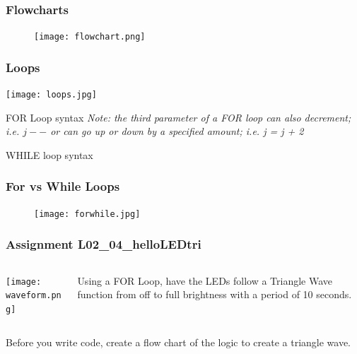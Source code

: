 \documentclass{beamer}
\begin{document}
\begin{frame}
\frametitle{Flowcharts}
\begin{figure}
\texttt{[image: flowchart.png]} 
\end{figure}
\end{frame}

\begin{frame}
\frametitle{Loops}
\begin{center}
\texttt{[image: loops.jpg]} 
\end{center}
\end{frame}


\begin{frame}{FOR Loop syntax}
\lstII
\vspace{0.50cm}
\emph{Note: the third parameter of a FOR loop can also decrement; i.e. $j--$ or can go up or down by a specified amount; i.e. j = j + 2}
\end{frame}


\begin{frame}{WHILE loop syntax}
\lstII
\end{frame}

\begin{frame}\frametitle{For vs While Loops}
\begin{figure}[h]
	\texttt{[image: forwhile.jpg]}
\end{figure}
\end{frame}

\begin{frame}\frametitle{Assignment L02\_04\_helloLEDtri}
\begin{columns}
\begin{column}{5cm}
\begin{overprint}
\texttt{[image: waveform.png]}
\end{overprint}
\end{column}
\begin{column}{4cm}
Using a FOR Loop, have the LEDs follow a Triangle Wave function from off to full brightness with a period of 10 seconds. 
\end{column}
\end{columns}

\vspace{0.5cm}
Before you write code, create a flow chart of the logic to create a triangle wave. 

\end{frame}
\end{document}
